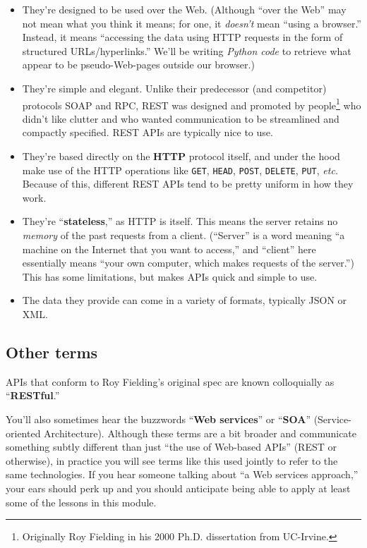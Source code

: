 \begin{itemize}
\itemsep.1em

\item They're designed to be used over the Web. (Although ``over the Web'' may
not mean what you think it means; for one, it \textit{doesn't} mean ``using a
browser.'' Instead, it means ``accessing the data using HTTP requests in the
form of structured URLs/hyperlinks.'' We'll be writing \textit{Python code} to
retrieve what appear to be pseudo-Web-pages outside our browser.)

\item They're simple and elegant. Unlike their predecessor (and competitor)
protocols SOAP and RPC, REST was designed and promoted by
people\footnote{Originally Roy Fielding in his 2000 Ph.D. dissertation from
UC-Irvine.} who didn't like clutter and who wanted communication to be
streamlined and compactly specified. REST APIs are typically nice to use.

\item They're based directly on the \textbf{HTTP} protocol itself, and under
the hood make use of the HTTP operations like \texttt{GET}, \texttt{HEAD},
\texttt{POST}, \texttt{DELETE}, \texttt{PUT}, \textit{etc.} Because of this,
different REST APIs tend to be pretty uniform in how they work.

\item They're ``\textbf{stateless},'' as HTTP is itself. This means the server
retains no \textit{memory} of the past requests from a client. (``Server'' is
a word meaning ``a machine on the Internet that you want to access,'' and
``client'' here essentially means ``your own computer, which makes requests of
the server.'') This has some limitations, but makes APIs quick and simple to
use.

\item The data they provide can come in a variety of formats, typically JSON
or XML.

\end{itemize}

\subsection{Other terms}

APIs that conform to Roy Fielding's original spec are known colloquially as
``\textbf{RESTful}.'' 

You'll also sometimes hear the buzzwords ``\textbf{Web services}'' or
``\textbf{SOA}'' (Service-oriented Architecture). Although these terms are a
bit broader and communicate something subtly different than just ``the use of
Web-based APIs'' (REST or otherwise), in practice you will see terms like this
used jointly to refer to the same technologies. If you hear someone talking
about ``a Web services approach,'' your ears should perk up and you should
anticipate being able to apply at least some of the lessons in this module.

